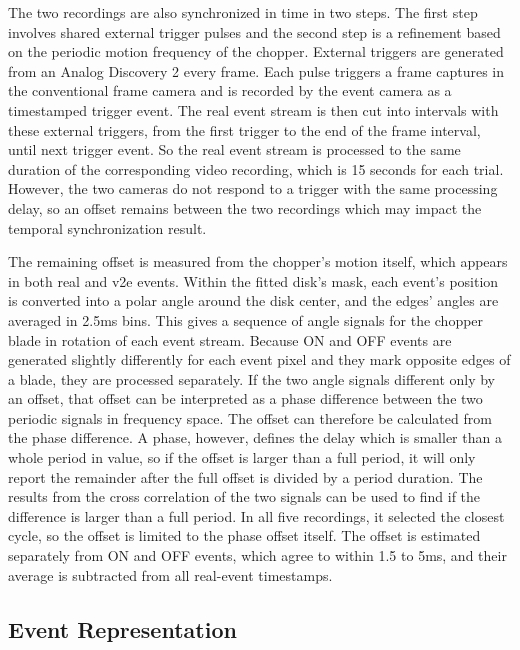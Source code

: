 The two recordings are also synchronized in time in two steps. The first step involves shared external trigger pulses and the second step is a refinement based on the periodic motion frequency of the chopper. External triggers are generated from an Analog Discovery 2 every frame. Each pulse triggers a frame captures in the conventional frame camera and is recorded by the event camera as a timestamped trigger event. The real event stream is then cut into intervals with these external triggers, from the first trigger to the end of the frame interval, until next trigger event. So the real event stream is processed to the same duration of the corresponding video recording, which is 15 seconds for each trial. However, the two cameras do not respond to a trigger with the same processing delay, so an offset remains between the two recordings which may impact the temporal synchronization result.   

The remaining offset is measured from the chopper's motion itself, which appears in both real and v2e events. Within the fitted disk's mask, each event's position is converted into a polar angle around the disk center, and the edges' angles are averaged in 2.5ms bins. This gives a sequence of angle signals for the chopper blade in rotation of each event stream. Because ON and OFF events are generated slightly differently for each event pixel and they mark opposite edges of a blade, they are processed separately. If the two angle signals different only by an offset, that offset can be interpreted as a phase difference between the two periodic signals in frequency space. The offset can therefore be calculated from the phase difference. A phase, however, defines the delay which is smaller than a whole period in value, so if the offset is larger than a full period, it will only report the remainder after the full offset is divided by a period duration. The results from the cross correlation of the two signals can be used to find if the difference is larger than a full period. In all five recordings, it selected the closest cycle, so the offset is limited to the phase offset itself. The offset is estimated separately from ON and OFF events, which agree to within 1.5 to 5ms, and their average is subtracted from all real-event timestamps.  


\subsection{Event Representation}
\label{sec:representation}

